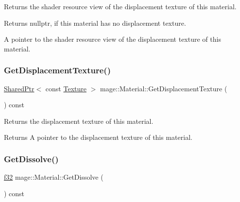 Returns the shader resource view of the displacement texture of this material.

\begin{DoxyReturn}{Returns}
{\ttfamily nullptr}, if this material has no displacement texture. 

A pointer to the shader resource view of the displacement texture of this material. 
\end{DoxyReturn}
\hypertarget{structmage_1_1_material_a4ed20c22d218a5e30258172117c4fa0f}{}\label{structmage_1_1_material_a4ed20c22d218a5e30258172117c4fa0f} 
\subsubsection{\texorpdfstring{Get\+Displacement\+Texture()}{GetDisplacementTexture()}}
{\footnotesize\ttfamily \hyperlink{namespacemage_a1e01ae66713838a7a67d30e44c67703e}{Shared\+Ptr}$<$ const \hyperlink{classmage_1_1_texture}{Texture} $>$ mage\+::\+Material\+::\+Get\+Displacement\+Texture (\begin{DoxyParamCaption}{ }\end{DoxyParamCaption}) const\hspace{0.3cm}{\ttfamily [noexcept]}}

Returns the displacement texture of this material.

\begin{DoxyReturn}{Returns}
A pointer to the displacement texture of this material. 
\end{DoxyReturn}
\hypertarget{structmage_1_1_material_a877801e3e4ade6ecfb57565e3201a834}{}\label{structmage_1_1_material_a877801e3e4ade6ecfb57565e3201a834} 
\subsubsection{\texorpdfstring{Get\+Dissolve()}{GetDissolve()}}
{\footnotesize\ttfamily \hyperlink{namespacemage_a6a44ad388483959dc4dff9f2aef91431}{f32} mage\+::\+Material\+::\+Get\+Dissolve (\begin{DoxyParamCaption}{ }\end{DoxyParamCaption}) const\hspace{0.3cm}{\ttfamily [noexcept]}}

